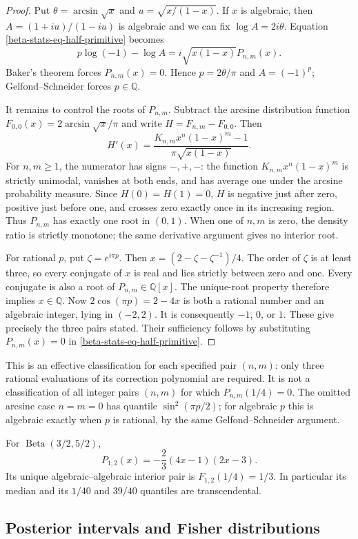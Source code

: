 \documentclass[11pt,a4paper]{article}
\theoremstyle{definition}
\theoremstyle{remark}
\numberwithin{equation}{section}
\begin{document}
\begin{proof}
Put $\theta=\arcsin\sqrt{x}$ and
$u=\sqrt{x/(1-x)}$. If $x$ is algebraic, then
$A=(1+iu)/(1-iu)$ is algebraic and we can fix $\log A=2i\theta$.
Equation \eqref{beta-stats-eq-half-primitive} becomes
\[
p\log(-1)-\log A=i\sqrt{x(1-x)}P_{n,m}(x).
\]
Baker's theorem forces $P_{n,m}(x)=0$. Hence $p=2\theta/\pi$ and
$A=(-1)^p$; Gelfond--Schneider forces $p\in\mathbb Q$.

It remains to control the roots of $P_{n,m}$. Subtract the arcsine
distribution function $F_{0,0}(x)=2\arcsin\sqrt{x}/\pi$ and write
$H=F_{n,m}-F_{0,0}$. Then
\[
H'(x)=\frac{K_{n,m}x^n(1-x)^m-1}{\pi\sqrt{x(1-x)}}.
\]
For $n,m\ge1$, the numerator has signs $-,+,-$: the function
$K_{n,m}x^n(1-x)^m$ is strictly unimodal, vanishes at both ends,
and has average one under the arcsine probability measure.
Since $H(0)=H(1)=0$, $H$ is negative just after zero, positive just
before one, and crosses zero exactly once in its increasing region.
Thus $P_{n,m}$ has exactly one root in $(0,1)$. When one of $n,m$
is zero, the density ratio is strictly monotone; the same derivative
argument gives no interior root.

For rational $p$, put $\zeta=e^{i\pi p}$. Then
$x=(2-\zeta-\zeta^{-1})/4$. The order of $\zeta$ is at least three,
so every conjugate of $x$ is real and lies strictly between zero and
one. Every conjugate is also a root of $P_{n,m}\in\mathbb Q[x]$.
The unique-root property therefore implies $x\in\mathbb Q$.
Now $2\cos(\pi p)=2-4x$ is both a rational number and an algebraic
integer, lying in $(-2,2)$. It is consequently $-1$, $0$, or $1$.
These give precisely the three pairs stated. Their sufficiency
follows by substituting $P_{n,m}(x)=0$ in
\eqref{beta-stats-eq-half-primitive}.
\end{proof}

This is an effective classification for each specified pair $(n,m)$:
only three rational evaluations of its correction polynomial are
required. It is not a classification of all integer pairs $(n,m)$
for which $P_{n,m}(1/4)=0$. The omitted arcsine case $n=m=0$ has
quantile $\sin^2(\pi p/2)$; for algebraic $p$ this is algebraic exactly
when $p$ is rational, by the same Gelfond--Schneider argument.

For $\operatorname{Beta}(3/2,5/2)$,
\[
P_{1,2}(x)=-\frac23(4x-1)(2x-3).
\]
Its unique algebraic--algebraic interior pair is
$F_{1,2}(1/4)=1/3$. In particular its median and its $1/40$ and
$39/40$ quantiles are transcendental.

\subsection{Posterior intervals and Fisher distributions}
\end{document}
